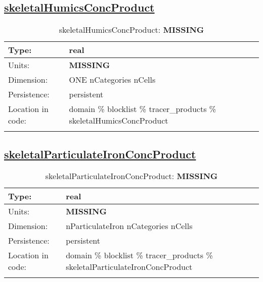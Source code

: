 \subsection[skeletalHumicsConcProduct]{\hyperref[sec:var_tab_tracer_products]{skeletalHumicsConcProduct}}
\label{subsec:var_sec_tracer_products_skeletalHumicsConcProduct}
\begin{center}
\begin{longtable}{| p{2.0in} | p{4.0in} |}
        \hline 
        Type: & real \\
        \hline 
        Units: & {\bf \color{red} MISSING} \\
        \hline 
        Dimension: & ONE nCategories nCells \\
        \hline 
        Persistence: & persistent \\
        \hline 
         Location in code: & domain \% blocklist \% tracer\_products \% skeletalHumicsConcProduct \\
         \hline 
    \caption{skeletalHumicsConcProduct: {\bf \color{red} MISSING}}
\end{longtable}
\end{center}
\subsection[skeletalParticulateIronConcProduct]{\hyperref[sec:var_tab_tracer_products]{skeletalParticulateIronConcProduct}}
\label{subsec:var_sec_tracer_products_skeletalParticulateIronConcProduct}
\begin{center}
\begin{longtable}{| p{2.0in} | p{4.0in} |}
        \hline 
        Type: & real \\
        \hline 
        Units: & {\bf \color{red} MISSING} \\
        \hline 
        Dimension: & nParticulateIron nCategories nCells \\
        \hline 
        Persistence: & persistent \\
        \hline 
         Location in code: & domain \% blocklist \% tracer\_products \% skeletalParticulateIronConcProduct \\
         \hline 
    \caption{skeletalParticulateIronConcProduct: {\bf \color{red} MISSING}}
\end{longtable}
\end{center}
